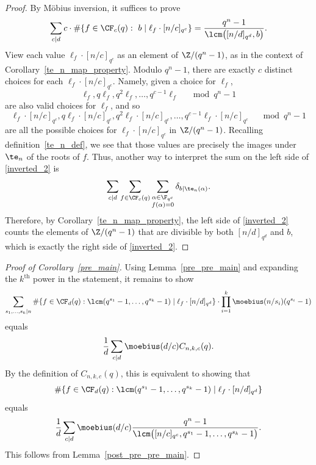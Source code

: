 \begin{proof}
By M\"obius inversion, it suffices to prove
\begin{equation}
\label{inverted_2}
\sum_{c \mid d} c \cdot \# \{f \in \CF_c (q) : \, \, b \mid \ell_f \cdot [n/c]_{q^c} \}
=
\frac{q^n-1}{\lcm \big (
[n/d]_{q^d}, b
\big )}.
\end{equation}
View each value \(\ell_f \cdot [n/c]_{q^c}\) as an element of \(\Z / (q^n-1)\), as in the context of Corollary~\ref{te_n_map_property}.
Modulo \(q^n-1\), there are exactly \(c\) distinct choices for each \(\ell_f \cdot [n/c]_{q^c}\).
Namely, given a choice for \(\ell_f\),
\[
\ell_f , q\ell_f , q^2\ell_f , \ldots, q^{c-1}\ell_f \quad \mod q^n-1
\]
are also valid choices for \(\ell_f\), and so
\[
\ell_f \cdot [n/c]_{q^c}, q\ell_f \cdot [n/c]_{q^c} , q^2 \ell_f \cdot [n/c]_{q^c} , \ldots, q^{c-1}\ell_f \cdot [n/c]_{q^c} \quad \mod q^n-1
\]
are all the possible choices for \(\ell_f \cdot [n/c]_{q^c}\) in \(\Z / (q^n-1)\).
Recalling definition~\eqref{te_n_def}, we see that those values are precisely the images under \(\te_n\) of the roots of \(f\).
Thus, another way to interpret the sum on the left side of \eqref{inverted_2} is
\[
\sum_{c \mid d} \sum_{f \in \CF_c (q)} \sum_{\substack{\alpha \in \F_{q^c} \\ f(\alpha) = 0}} \delta_{b \mid \te_n(\alpha)}.
\]
Therefore, by Corollary~\ref{te_n_map_property}, the left side of \eqref{inverted_2} counts the elements of \(\Z / (q^n-1)\) that are divisible by both \([n/d]_{q^d}\) and \(b\),
which is exactly the right side of \eqref{inverted_2}.
\end{proof}




\begin{proof}[Proof of Corollary~\ref{pre_main}]
Using Lemma~\ref{pre_pre_main} and expanding the \(k^\text{th}\) power in the statement, it remains to show
\[
\sum_{s_1,\ldots,s_k \mid n}
\# \{f \in \CF_d (q) : \lcm(q^{s_1}-1,\ldots,q^{s_k}-1) \mid \ell_f \cdot [n/d]_{q^d}\}
\cdot
\prod_{i=1}^k \moebius(n/s_i)(q^{s_i}-1)
\]
equals
\[
\frac{1}{d} \sum_{c \mid d} \moebius(d/c) C_{n,k,c} (q).
\]
By the definition of \(C_{n,k,c} (q)\),
this is equivalent to showing that
\[
\# \{f \in \CF_d (q) : \lcm(q^{s_1}-1,\ldots,q^{s_k}-1) \mid \ell_f \cdot [n/d]_{q^d} \}
\]
equals
\[
\frac{1}{d}
\sum_{c \mid d}
\moebius(d/c)
\frac{q^n-1}{\lcm \big ( [n/c]_{q^c}, q^{s_1}-1, \ldots, q^{s_k}-1 \big )}.
\]
This follows from Lemma~\ref{post_pre_pre_main}.
\end{proof}





































